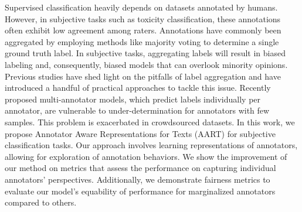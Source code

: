 Supervised classification heavily depends on datasets annotated by humans. However, in subjective tasks such as toxicity classification, these annotations often exhibit low agreement among raters. Annotations have commonly been aggregated by employing methods like majority voting to determine a single ground truth label. In subjective tasks, aggregating labels will result in biased labeling and, consequently, biased models that can overlook minority opinions. Previous studies have shed light on the pitfalls of label aggregation and have introduced a handful of practical approaches to tackle this issue. Recently proposed multi-annotator models, which predict labels individually per annotator, are vulnerable to under-determination for annotators with few samples. This problem is exacerbated in crowdsourced datasets. In this work, we propose Annotator Aware Representations for Texts (AART) for subjective classification tasks. Our approach involves learning representations of annotators, allowing for exploration of annotation behaviors.  We show the improvement of our method on metrics that assess the performance on capturing individual annotators' perspectives. Additionally, we demonstrate fairness metrics to evaluate our model's equability of performance for marginalized annotators compared to others.